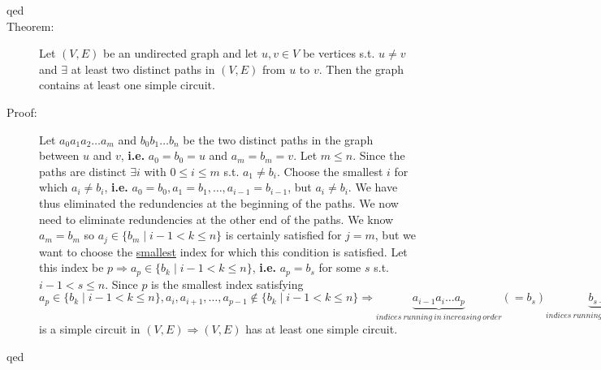 \documentclass[10pt]{article}
\begin{document}
\begin{description}
		\item[qed]
		\item[Theorem:] Let $(V, E)$ be an undirected graph and let $u, v \in V$ be vertices s.t. $u \neq v$ and $\exists$ at least two distinct paths in $(V, E)$ from $u$ to $v$. Then the graph contains at least one simple circuit.
		\item[Proof:] Let $a_0 a_1 a_2 \dots a_m$ and $b_0 b_1 \dots b_n$ be the two distinct paths in the graph between $u$ and $v$, \textbf{i.e.} $a_0 = b_0 = u$ and $a_m = b_m = v$. Let $m \leq n$. Since the paths are distinct $\exists i$ with $0 \leq i \leq m$ s.t. $a_1 \neq b_i$. Choose the smallest $i$ for which $a_i \neq b_i$, \textbf{i.e.} $a_0 = b_0, a_1 = b_1, \dots, a_{i-1} = b_{i-1}$, but $a_i \neq b_i$. We have thus eliminated the redundencies at the beginning of the paths. We now need to eliminate redundencies at the other end of the paths. We know $a_m = b_m$ so $a_j \in \{b_m \mid i-1 < k \leq n \}$ is certainly satisfied for $j=m$, but we want to choose the \underline{smallest} index for which this condition is satisfied. Let this index be $p \Rightarrow a_p \in \{b_k \mid i-1 < k \leq n \}$, \textbf{i.e.} $a_p = b_s$ for some $s$ s.t. $i-1 < s \leq n$. Since $p$ is the smallest index satisfying $a_p \in \{b_k \mid i-1 < k \leq n \}, a_i, a_{i+1}, \dots, a_{p-1} \notin \{b_k \mid i-1 < k \leq n \} \Rightarrow \underset{indices \: running \: in \: increasing \: order}{\underbrace{a_{i-1} a_i \dots a_p}} (= b_s) \underset{indices \: running \: in \: decreasing \: order}{\underbrace{b_{s-1}\dots b_i}} a_{i-1} (=b_{i-1})$ is a simple circuit in $(V, E) \Rightarrow (V, E)$ has at least one simple circuit.
		\item[qed]
	\end{description}
	
\end{document}
